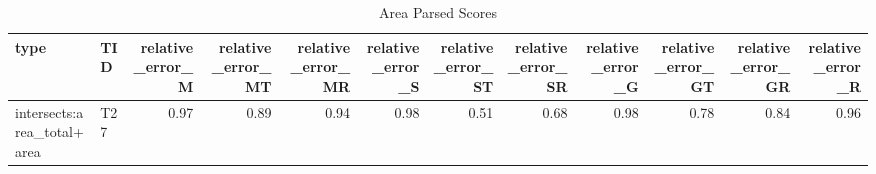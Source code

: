 \begin{table}
\caption{Area Parsed Scores}
\label{tab:area_parsed_scores}
\begin{tabular}{llrrrrrrrrrr}
\hline
type & TID & relative\_error\_M & relative\_error\_MT & relative\_error\_MR & relative\_error\_S & relative\_error\_ST & relative\_error\_SR & relative\_error\_G & relative\_error\_GT & relative\_error\_GR & relative\_error\_R \\
\hline
intersects:area\_total+area & T27 & 0.97 & 0.89 & 0.94 & 0.98 & 0.51 & 0.68 & 0.98 & 0.78 & 0.84 & 0.96 \\
\hline
\end{tabular}
\end{table}

